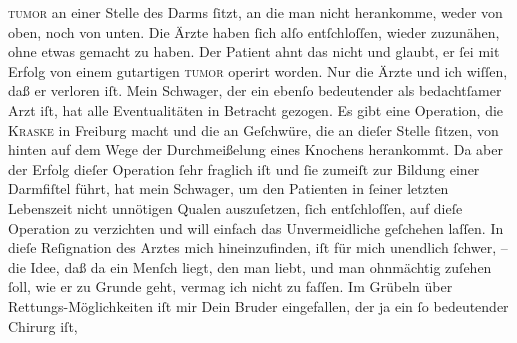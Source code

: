 \begin{ledgroupsized}[t]{13cm}
                  \textsc{tumor} an einer Stelle des Darms ſitzt, an die man nicht
               herankomme, weder von oben, noch von unten. Die Ärzte haben ſich alſo entſchloſſen,
               wieder zuzunähen, ohne etwas gemacht zu haben. Der Patient ahnt das nicht und glaubt, er ſei
               mit Erfolg von einem gutartigen \textsc{tumor} operirt worden. Nur
               die Ärzte und ich wiſſen, daß er verloren iſt. {\pb}Mein
                  Schwager, der ein ebenſo
               bedeutender als bedachtſamer Arzt iſt, hat alle Eventualitäten in Betracht gezogen.
               Es gibt eine Operation, die \textsc{Kraske} in Freiburg macht und die an Geſchwüre, die
               an dieſer Stelle ſitzen, von hinten auf dem Wege der Durchmeißelung eines Knochens
               herankommt. Da aber der Erfolg dieſer Operation ſehr fraglich iſt und ſie zumeiſt zur
               Bildung einer Darmfiſtel führt, hat mein Schwager, um den Patienten in ſeiner letzten Lebenszeit nicht unnötigen Qualen
               auszuſetzen, ſich entſchloſſen, auf dieſe Operation zu verzichten und will einfach
               das Unvermeidliche geſchehen laſſen.\pend
           \pstart
           In dieſe Reſignation des Arztes {\pb}mich hineinzufinden, iſt für mich
               unendlich ſchwer, – die Idee, daß da ein Menſch liegt, den man liebt, und man  ohnmächtig zuſehen ſoll, wie er zu Grunde geht, vermag ich nicht zu faſſen. Im
               Grübeln über Rettungs-Möglichkeiten iſt mir Dein Bruder eingefallen, der ja ein ſo bedeutender Chirurg iſt,

\end{ledgroupsized}
